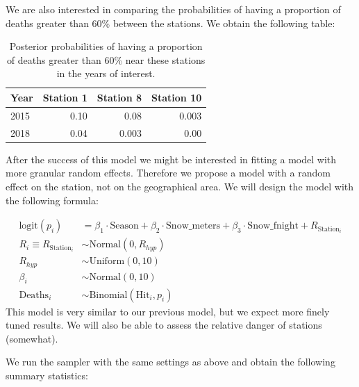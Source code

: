 \documentclass[10pt]{extarticle}
\begin{document}
We are also interested in comparing the probabilities of having a proportion of deaths greater than 60\% between the stations. We obtain the following table:

\begin{table}[ht]
	\centering
	\begin{tabular}{l|r|r|r}
		\hline
		Year & Station 1 & Station 8 & Station 10 \\
		\hline
		2015 & 0.10 & 0.08 & 0.003 \\
		2018 & 0.04 & 0.003 & 0.00 \\
		\hline
	\end{tabular}
	\caption{Posterior probabilities of having a proportion of deaths greater than 60\% near these stations in the years of interest.}
	\label{tab:post_60}
\end{table}

After the success of this model we might be interested in fitting a model with more granular random effects. Therefore we propose a model with a random effect on the station, not on the geographical area. We will design the model with the following formula:

\begin{align*}
\mathrm{logit}(p_i) &= \beta_1 \cdot \mathrm{Season} + \beta_2 \cdot \mathrm{Snow\_meters} + \beta_3 \cdot \mathrm{Snow\_fnight} + R_{\mathrm{Station}_i}\\
R_i \equiv R_{\mathrm{Station}_i} &\sim \mathrm{Normal}(0, R_{hyp})\\
R_{hyp} &\sim \mathrm{Uniform}(0, 10)\\
\beta_i &\sim \mathrm{Normal}(0, 10)\\
\mathrm{Deaths}_i &\sim \mathrm{Binomial}(\mathrm{Hit}_i, p_i)
\end{align*}
This model is very similar to our previous model, but we expect more finely tuned results. We will also be able to assess the relative danger of stations (somewhat). 

We run the sampler with the same settings as above and obtain the following summary statistics: 
\end{document}
